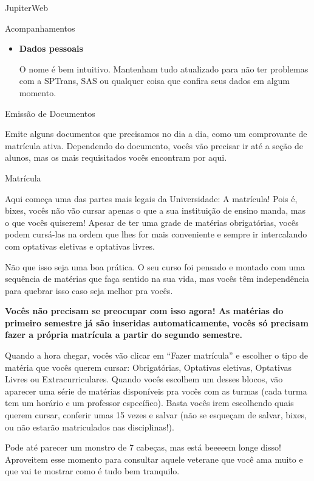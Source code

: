 \begin{secao}{JupiterWeb}
\begin{subsecao}{Acompanhamentos}
\begin{itemize}
  \item \textbf{Dados pessoais}

    O nome é bem intuitivo. Mantenham tudo atualizado para não ter problemas com
    a SPTrans, SAS ou qualquer coisa que confira seus dados em algum momento.

\end{itemize}

\end{subsecao}

\begin{subsecao}{Emissão de Documentos}

Emite alguns documentos que precisamos no dia a dia, como um comprovante de
matrícula ativa. Dependendo do documento, vocês vão precisar ir até a seção de
alunos, mas os mais requisitados vocês encontram por aqui.

\end{subsecao}

\begin{subsecao}{Matrícula}

Aqui começa uma das partes mais legais da Universidade: A matrícula! Pois é,
bixes, vocês não vão cursar apenas o que a sua instituição de ensino manda, mas o
que vocês quiserem! Apesar de ter uma grade de matérias obrigatórias, vocês
podem cursá-las na ordem que lhes for mais conveniente e sempre ir intercalando
com optativas eletivas e optativas livres.

Não que isso seja uma boa prática. O seu curso foi pensado e montado com uma
sequência de matérias que faça sentido na sua vida, mas vocês têm independência
para quebrar isso caso seja melhor pra vocês.

\textbf{Vocês não precisam se preocupar com isso agora! As matérias do primeiro
semestre já são inseridas automaticamente, vocês só precisam fazer a própria
matrícula a partir do segundo semestre.}

Quando a hora chegar, vocês vão clicar em “Fazer matrícula” e escolher o tipo de
matéria que vocês querem cursar: Obrigatórias, Optativas eletivas, Optativas
Livres ou Extracurriculares. Quando vocês escolhem um desses blocos, vão
aparecer uma série de matérias disponíveis pra vocês com as turmas (cada turma
tem um horário e um professor específico). Basta vocês irem escolhendo quais
querem cursar, conferir umas 15 vezes e salvar (não se esqueçam de salvar,
bixes, ou não estarão matriculados nas disciplinas!).

Pode até parecer um monstro de 7 cabeças, mas está beeeeem longe disso!
Aproveitem esse momento para consultar aquele veterane que você ama muito e que
vai te mostrar como é tudo bem tranquilo.


\end{subsecao}
\end{secao}

